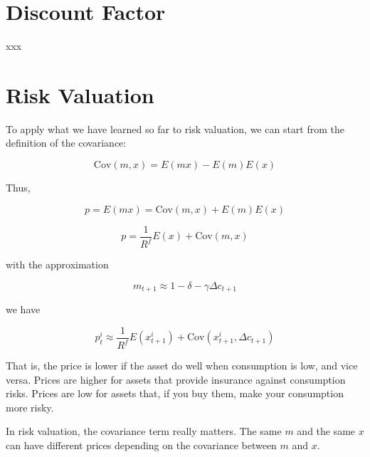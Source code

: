 \section{Discount Factor}


\begin{tcolorbox}[colback=white, colframe=black, title=Example X]
    xxx
\end{tcolorbox}

\section{Risk Valuation}

To apply what we have learned so far to risk valuation, we can start
from the definition of the covariance:

\begin{equation}
    \text{Cov}(m, x) = E(mx) - E(m)E(x)
\end{equation}

Thus,

\begin{equation}
    p = E(mx) = \text{Cov}(m, x) + E(m)E(x)
\end{equation}

\begin{equation}
    p = \frac{1}{R^f} E(x) + \text{Cov}(m, x)
\end{equation}

with the approximation

\begin{equation}
    m_{t+1} \approx 1 - \delta - \gamma \Delta c_{t+1}
\end{equation}

we have

\begin{equation}
p^i_t \approx \frac{1}{R^f} E(x^i_{t+1}) + \text{Cov}(x^i_{t+1}, \Delta c_{t+1})
\end{equation}

That is, the price is lower if the asset do well 
when consumption is low, and vice versa. Prices are higher 
for assets that provide insurance against consumption risks.
Prices are low for assets that, if you buy them, make your consumption
more risky. 

In risk valuation, the covariance term really matters. 
The same $m$ and the same $x$ can have different prices depending on the covariance between
$m$ and $x$. 


